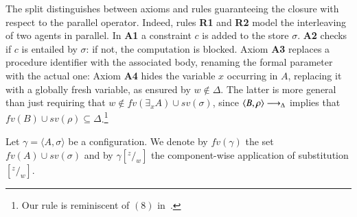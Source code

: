 \documentclass[main.tex]{subfiles}
\begin{document}
The split distinguishes between axioms and rules guaranteeing the closure with respect to the parallel operator. Indeed, rules {\bf  R1}  and {\bf  R2} model the interleaving of two agents in parallel.
%
%
In {\bf A1} a constraint $c$ is added to the store $\sigma$.
%
{\bf A2} checks if $c$ is entailed by  $\sigma$: if not, the computation is blocked.
%
%
%
Axiom {\bf A3} replaces a procedure identifier with the associated body, renaming the formal parameter with the actual one:
%
Axiom {\bf A4} hides the variable $x$ occurring in $A$, replacing it  
with a globally fresh variable,
as ensured by $w \not \in \Delta$.
The latter is more general than just requiring that 
$w \not \in fv(\exists_x A) \cup sv(\sigma)$, since
$\langle B, \rho \rangle   \longrightarrow_\Delta$ implies that 
$fv(B) \cup sv(\rho) \subseteq \Delta$.\footnote{Our rule is  reminiscent of 
$(8)$ in~\cite[p.~342]{popl91}.}
%
%
%

Let $\gamma = \langle A, \sigma \rangle$ be a configuration.
%
We denote by $fv(\gamma)$ the set $fv(A) \cup sv(\sigma)$ and by
$\gamma[^z/_w]$ the component-wise application of substitution $[^z/_w]$.
\end{document}
